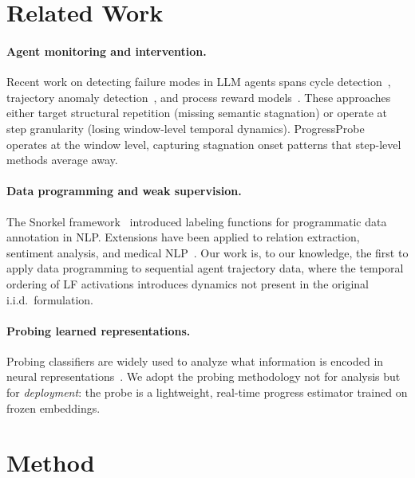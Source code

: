 \documentclass[11pt,a4paper]{article}
\begin{document}
\section{Related Work}

\paragraph{Agent monitoring and intervention.}
Recent work on detecting failure modes in LLM agents spans cycle detection~\cite{chen2024codeagent}, trajectory anomaly detection~\cite{guo2024specra}, and process reward models~\cite{luo2024agentprm,chen2024swetrace}.
These approaches either target structural repetition (missing semantic stagnation) or operate at step granularity (losing window-level temporal dynamics).
ProgressProbe operates at the window level, capturing stagnation onset patterns that step-level methods average away.

\paragraph{Data programming and weak supervision.}
The Snorkel framework~\cite{ratner2017snorkel} introduced labeling functions for programmatic data annotation in NLP.
Extensions have been applied to relation extraction, sentiment analysis, and medical NLP~\cite{ratner2019weaksuper}.
Our work is, to our knowledge, the first to apply data programming to sequential agent trajectory data, where the temporal ordering of LF activations introduces dynamics not present in the original i.i.d.\ formulation.

\paragraph{Probing learned representations.}
Probing classifiers are widely used to analyze what information is encoded in neural representations~\cite{belinkov2022probing}.
We adopt the probing methodology not for analysis but for \emph{deployment}: the probe is a lightweight, real-time progress estimator trained on frozen embeddings.

\section{Method}
\end{document}
